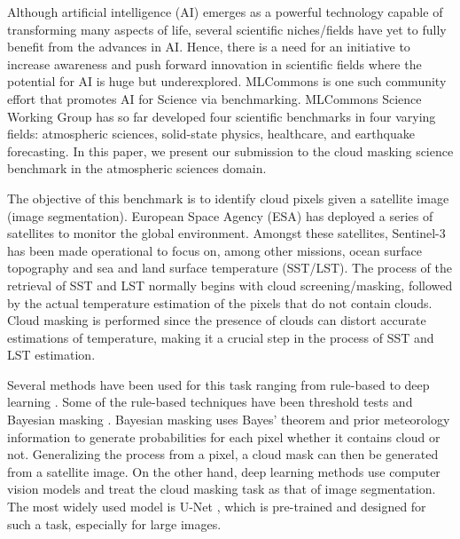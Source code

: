 \documentclass[sigplan,screen]{acmart}
\begin{document}
\nocite{las-2023-ai-workflow} %

Although artificial intelligence (AI) emerges as a powerful technology capable of transforming many aspects of life, several scientific niches/fields have yet to fully benefit from the advances in AI. Hence, there is a need for an initiative to increase awareness and push forward innovation in scientific fields where the potential for AI is huge but underexplored. 
MLCommons \cite{www-mlcommons-research}  is one such community effort that promotes AI for Science via benchmarking. MLCommons Science Working Group \cite{Thiyagalingam2022AIBF} has so far developed four scientific benchmarks in four varying fields: atmospheric sciences, solid-state physics, healthcare, and earthquake forecasting. In this paper, we present our submission to the cloud masking science benchmark in the atmospheric sciences domain. 

The objective of this benchmark \cite{Thiyagalingam2022AIBF} is to identify cloud pixels given a satellite image (image segmentation). European Space Agency (ESA) \cite{www-sentinel92} has deployed a series of satellites to monitor the global environment. Amongst these satellites, Sentinel-3 has been made operational to focus on, among other missions, ocean surface topography and sea and land surface temperature (SST/LST). The process of the retrieval of SST and LST normally begins with cloud screening/masking, followed by the actual temperature estimation of the pixels that do not contain clouds. Cloud masking is performed since the presence of clouds can distort accurate estimations of temperature, making it a crucial step in the process of SST and LST estimation. 

Several methods have been used for this task ranging from rule-based \cite{Saunders1986AnAS,Saunders1988AnIM,Merchant2005ProbabilisticPB, Zhu2012ObjectbasedCA} to deep learning \cite{Li2019DeepLB,Domnich2021KappaMaskAC,Yan2018CloudAC,WIELAND2019111203,JEPPESEN2019247}. Some of the rule-based techniques have been threshold tests \cite{Saunders1986AnAS,Saunders1988AnIM} and Bayesian masking \cite{Merchant2005ProbabilisticPB}. Bayesian masking uses Bayes' theorem and prior meteorology information to generate probabilities for each pixel whether it contains cloud or not. Generalizing the process from a pixel, a cloud mask can then be generated from a satellite image. On the other hand, deep learning methods \cite{Li2019DeepLB,Domnich2021KappaMaskAC,Yan2018CloudAC,WIELAND2019111203,JEPPESEN2019247} use computer vision models and treat the cloud masking task as that of image segmentation. The most widely used model is U-Net \cite{Ronneberger2015UNetCN}, which is pre-trained and designed for such a task, especially for large images.
\end{document}
